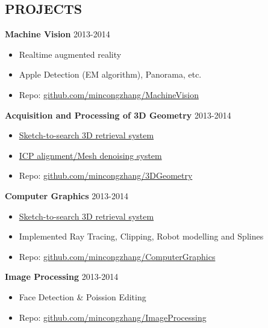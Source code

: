\documentclass[line,margin]{res}
\begin{document}
\begin{resume}
\section{PROJECTS}
{\bf Machine Vision}
\hfill{\textcolor[rgb]{0.7,0.7,0.7}{2013-2014}}
\begin{itemize}\itemsep -2pt %
    \item Realtime augmented reality
    \item Apple Detection (EM algorithm), Panorama, etc.
    \item Repo: \href{https://github.com/mincongzhang/MachineVision}{github.com/mincongzhang/MachineVision}
\end{itemize}

{\bf Acquisition and Processing of 3D Geometry}
\hfill{\textcolor[rgb]{0.7,0.7,0.7}{2013-2014}}
\begin{itemize}\itemsep -2pt %
    \item \href{https://github.com/mincongzhang/3D_Retrieval_sketch2search}{Sketch-to-search 3D retrieval system}
    \item \href{https://github.com/mincongzhang/PlayWithOpenMesh}{ICP alignment/Mesh denoising system}
    \item Repo: \href{https://github.com/mincongzhang/3DGeometry}{github.com/mincongzhang/3DGeometry}
\end{itemize}

{\bf Computer Graphics}
\hfill{\textcolor[rgb]{0.7,0.7,0.7}{2013-2014}}
\begin{itemize}\itemsep -2pt %
    \item \href{https://github.com/mincongzhang/3D_Retrieval_sketch2search}{Sketch-to-search 3D retrieval system}
    \item Implemented Ray Tracing, Clipping, Robot modelling and Splines
    \item Repo: \href{https://github.com/mincongzhang/ComputerGraphics}{github.com/mincongzhang/ComputerGraphics}
\end{itemize}

{\bf Image Processing}
\hfill{\textcolor[rgb]{0.7,0.7,0.7}{2013-2014}}
\begin{itemize}\itemsep -2pt %
    \item Face Detection \& Poission Editing
    \item Repo: \href{https://github.com/mincongzhang/ImageProcessing/tree/master/PostGrad}{github.com/mincongzhang/ImageProcessing}
\end{itemize}


\end{resume}
\end{document}
